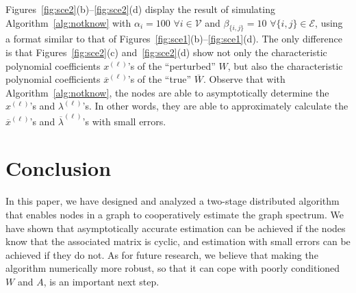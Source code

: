 \documentclass[11pt]{article}
\theoremstyle{plain}
\theoremstyle{definition}
\theoremstyle{remark}
\begin{document}
Figures~\ref{fig:sce2}(b)--\ref{fig:sce2}(d) display the result of simulating Algorithm~\ref{alg:notknow} with $\alpha_i=100$ $\forall i\in\mathcal{V}$ and $\beta_{\{i,j\}}=10$ $\forall\{i,j\}\in\mathcal{E}$, using a format similar to that of Figures~\ref{fig:sce1}(b)--\ref{fig:sce1}(d). The only difference is that Figures~\ref{fig:sce2}(c) and~\ref{fig:sce2}(d) show not only the characteristic polynomial coefficients $x^{(\ell)}$'s of the ``perturbed'' $W$, but also the characteristic polynomial coefficients $\overline{x}^{(\ell)}$'s of the ``true'' $\overline{W}$. Observe that with Algorithm~\ref{alg:notknow}, the nodes are able to asymptotically determine the $x^{(\ell)}$'s and $\lambda^{(\ell)}$'s. In other words, they are able to approximately calculate the $\overline{x}^{(\ell)}$'s and $\overline{\lambda}^{(\ell)}$'s with small errors.

\section{Conclusion}\label{sec:conc}

In this paper, we have designed and analyzed a two-stage distributed algorithm that enables nodes in a graph to cooperatively estimate the graph spectrum. We have shown that asymptotically accurate estimation can be achieved if the nodes know that the associated matrix is cyclic, and estimation with small errors can be achieved if they do not. As for future research, we believe that making the algorithm numerically more robust, so that it can cope with poorly conditioned $W$ and $A$, is an important next step.



\end{document}
